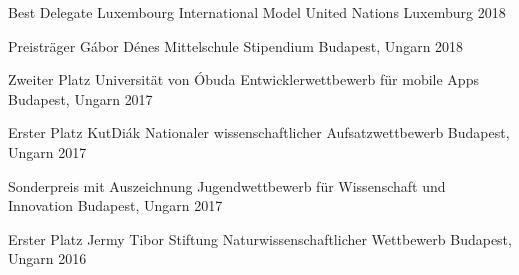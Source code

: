 

\cvsubsection{}


\begin{cvhonors}

  \cvhonor
  	{Best Delegate}
    {Luxembourg International Model United Nations}
    {Luxemburg}
    {2018}
  
  \cvhonor
    {Preisträger} %
    {Gábor Dénes Mittelschule Stipendium} %
    {Budapest, Ungarn} %
    {2018} %
  
   \cvhonor
    {Zweiter Platz} %
    {Universität von Óbuda Entwicklerwettbewerb für mobile Apps} %
    {Budapest, Ungarn} %
    {2017} %
    
     \cvhonor
    {Erster Platz} %
    {KutDiák Nationaler wissenschaftlicher Aufsatzwettbewerb} %
    {Budapest, Ungarn} %
    {2017} %
    
    \cvhonor
    {Sonderpreis mit Auszeichnung} %
    {Jugendwettbewerb für Wissenschaft und Innovation} %
    {Budapest, Ungarn} %
    {2017} %

    
  \cvhonor
    {Erster Platz} %
    {Jermy Tibor Stiftung Naturwissenschaftlicher Wettbewerb} %
    {Budapest, Ungarn} %
    {2016} %

  
 

 
    
   

\end{cvhonors}



